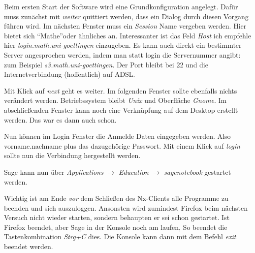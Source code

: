 \documentclass[a4paper,10pt,DIV15]{scrartcl}
\begin{document}
Beim ersten Start der Software wird eine Grundkonfiguration angelegt. Dafür muss zunächst mit \emph{weiter} quittiert werden, dass ein Dialog
durch diesen Vorgang führen wird. 
Im nächsten Fenster muss ein \emph{Session} Name vergeben werden. Hier bietet sich \textquotedblleft Mathe\textquotedblright oder ähnliches an.
Interessanter ist das Feld \emph{Host} ich empfehle hier \emph{login.math.uni-goettingen} einzugeben. Es kann auch direkt ein bestimmter Server
angesprochen werden, indem man statt login die Servernummer angibt: zum Beispiel \emph{s3.math.uni-goettingen}.
Der Port bleibt bei 22 und die Internetverbindung (hoffentlich) auf ADSL. 

Mit Klick auf \emph{next} geht es weiter. Im folgenden Fenster sollte ebenfalls nichts verändert werden.
 Betriebssystem bleibt \emph{Unix} und Oberfläche \emph{Gnome}. 
Im abschließenden Fenster kann noch eine Verknüpfung auf dem Desktop erstellt werden. Das war es dann auch schon.

Nun können im Login Fenster die Anmelde Daten eingegeben werden. Also vorname.nachname plus das dazugehörige Passwort. Mit einem Klick auf 
\emph{login} sollte nun die Verbindung hergestellt werden. 

Sage kann nun über \emph{Applications} $\to$ \emph{Education} $\to$ \emph{sagenotebook} gestartet werden. 

Wichtig ist am Ende \emph{vor} dem Schließen des Nx-Clients alle Programme zu beenden und sich auszuloggen. Ansonsten wird zumindest Firefox beim
nächsten Versuch nicht wieder starten, sondern behaupten er sei schon gestartet. Ist Firefox beendet, aber Sage in der Konsole noch am laufen, So 
beendet die Tastenkombination \emph{Strg+C} dies. Die Konsole kann dann mit dem Befehl \emph{exit} beendet werden.
\end{document}
